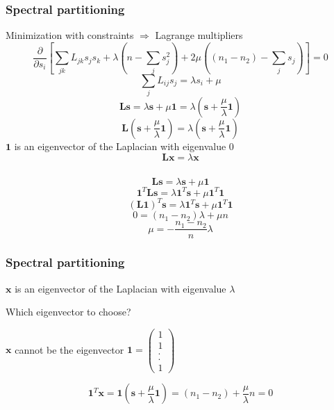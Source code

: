 \documentclass{beamer}
\begin{document}
\begin{frame}
    \frametitle{Spectral partitioning}
    \centering
Minimization with constraints $\Rightarrow$ Lagrange multipliers
    $$\frac{\partial}{\partial s_i}\left[\sum\limits_{jk}L_{jk}s_js_k + \lambda\left(n-\sum\limits_{j}s_j^2\right) + 2\mu\left((n_1-n_2)-\sum\limits_js_j\right)\right] = 0$$
    \pause
    $$\sum\limits_jL_{ij}s_j = \lambda s_i + \mu$$
\justifying
    \pause
$${\mathbf L}{\mathbf s} = \lambda {\mathbf s} + \mu {\mathbf 1} = \lambda \left({\mathbf s} + \frac{\mu}{\lambda}{\mathbf 1}\right)$$
    \pause
    $${\mathbf L}\left({\mathbf s} + \frac{\mu}{\lambda}{\mathbf 1}\right) = \lambda \left({\mathbf s} + \frac{\mu}{\lambda}{\mathbf 1}\right)$$
    \centering
    ${\mathbf 1}$ is an eigenvector of the Laplacian with eigenvalue $0$
    $${\mathbf L}{\mathbf x}=\lambda {\mathbf x}$$
\end{frame}
\begin{frame}
    \frametitle{}
    \centering
    $${\mathbf L}{\mathbf s} = \lambda {\mathbf s} + \mu {\mathbf 1}$$
    \vspace{0.25em}
    $${\mathbf 1}^T{\mathbf L}{\mathbf s} = \lambda {\mathbf 1}^T{\mathbf s} + \mu {\mathbf 1}^T{\mathbf 1}$$
    \vspace{0.25em}
    $$({\mathbf L}{\mathbf 1})^T{\mathbf s} =\lambda {\mathbf 1}^T{\mathbf s} + \mu {\mathbf 1}^T{\mathbf 1}$$
    \vspace{0.25em}
    $$0 = (n_1-n_2)\lambda + \mu n$$
    \vspace{0.25em}
    $$\mu = -\frac{n_1-n_2}{n}\lambda$$
\end{frame}
\begin{frame}
    \frametitle{Spectral partitioning}
    \centering
    ${\mathbf x}$ is an eigenvector of the Laplacian with eigenvalue $\lambda$ 

    \vspace{1em}
    Which eigenvector to choose?

    \vspace{1em}
    ${\mathbf x}$ cannot be the eigenvector ${\mathbf 1} = \begin{pmatrix}1\\1\\.\\.\\1\end{pmatrix}$

        $${\mathbf 1}^T{\mathbf x} = {\mathbf 1}\left({\mathbf s} + \frac{\mu}{\lambda}{\mathbf 1}\right) = (n_1-n_2) + \frac{\mu}{\lambda}n = 0$$
\end{frame}
\end{document}
